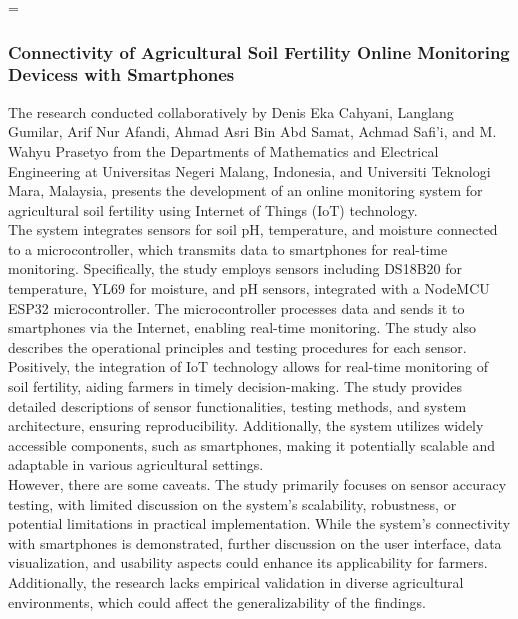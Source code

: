 =\documentclass[12pt, a4paper]{article}
\begin{document}
\subsubsection{Connectivity of Agricultural Soil Fertility Online Monitoring Devicess with Smartphones}
The research conducted collaboratively by Denis Eka Cahyani, Langlang Gumilar, Arif Nur Afandi, Ahmad Asri Bin Abd Samat, Achmad Safi'i, and M. Wahyu Prasetyo \cite{cahyani2023connectivity} from the Departments of Mathematics and Electrical Engineering at Universitas Negeri Malang, Indonesia, and Universiti Teknologi Mara, Malaysia, presents the development of an online monitoring system for agricultural soil fertility using Internet of Things (IoT) technology.\\
The system integrates sensors for soil pH, temperature, and moisture connected to a microcontroller, which transmits data to smartphones for real-time monitoring. Specifically, the study employs sensors including DS18B20 for temperature, YL69 for moisture, and pH sensors, integrated with a NodeMCU ESP32 microcontroller. The microcontroller processes data and sends it to smartphones via the Internet, enabling real-time monitoring. The study also describes the operational principles and testing procedures for each sensor.\\
Positively, the integration of IoT technology allows for real-time monitoring of soil fertility, aiding farmers in timely decision-making. The study provides detailed descriptions of sensor functionalities, testing methods, and system architecture, ensuring reproducibility. Additionally, the system utilizes widely accessible components, such as smartphones, making it potentially scalable and adaptable in various agricultural settings.\\
However, there are some caveats. The study primarily focuses on sensor accuracy testing, with limited discussion on the system's scalability, robustness, or potential limitations in practical implementation. While the system's connectivity with smartphones is demonstrated, further discussion on the user interface, data visualization, and usability aspects could enhance its applicability for farmers. Additionally, the research lacks empirical validation in diverse agricultural environments, which could affect the generalizability of the findings.
\end{document}
